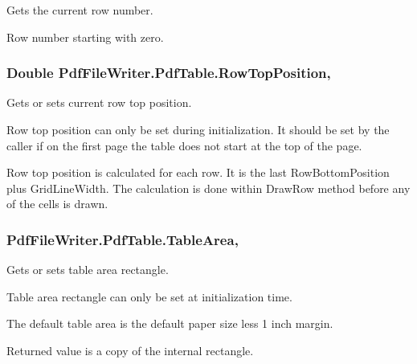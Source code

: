 Gets the current row number. 

Row number starting with zero.
\subsubsection[{\texorpdfstring{Row\+Top\+Position}{RowTopPosition}}]{\setlength{\rightskip}{0pt plus 5cm}Double Pdf\+File\+Writer.\+Pdf\+Table.\+Row\+Top\+Position\hspace{0.3cm}{\ttfamily [get]}, {\ttfamily [set]}}\hypertarget{class_pdf_file_writer_1_1_pdf_table_aac22bde61a2ed6990ffcb1bf06cb3ee6}{}\label{class_pdf_file_writer_1_1_pdf_table_aac22bde61a2ed6990ffcb1bf06cb3ee6}


Gets or sets current row top position. 

Row top position can only be set during initialization. It should be set by the caller if on the first page the table does not start at the top of the page. 

Row top position is calculated for each row. It is the last Row\+Bottom\+Position plus Grid\+Line\+Width. The calculation is done within Draw\+Row method before any of the cells is drawn. 
\subsubsection[{\texorpdfstring{Table\+Area}{TableArea}}]{ Pdf\+File\+Writer.\+Pdf\+Table.\+Table\+Area\hspace{0.3cm}{\ttfamily [get]}, {\ttfamily [set]}}\hypertarget{class_pdf_file_writer_1_1_pdf_table_a876893813bf86ae113c6dc4a0effcf51}{}\label{class_pdf_file_writer_1_1_pdf_table_a876893813bf86ae113c6dc4a0effcf51}


Gets or sets table area rectangle. 

Table area rectangle can only be set at initialization time. 

The default table area is the default paper size less 1 inch margin. 

Returned value is a copy of the internal rectangle. 

